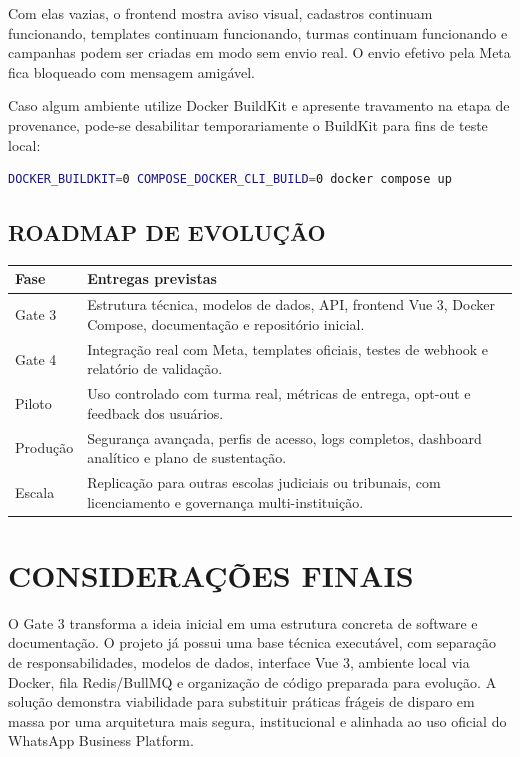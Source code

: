 \documentclass[12pt,letterpaper,oneside]{report}
\begin{document}
Com elas vazias, o frontend mostra aviso visual, cadastros continuam funcionando, templates continuam funcionando, turmas continuam funcionando e campanhas podem ser criadas em modo sem envio real. O envio efetivo pela Meta fica bloqueado com mensagem amigável.

Caso algum ambiente utilize Docker BuildKit e apresente travamento na etapa de provenance, pode-se desabilitar temporariamente o BuildKit para fins de teste local:

\begin{lstlisting}[language=bash]
DOCKER_BUILDKIT=0 COMPOSE_DOCKER_CLI_BUILD=0 docker compose up
\end{lstlisting}

\section{ROADMAP DE EVOLUÇÃO}

\begin{quadro}[H]
\centering
\caption{Roadmap técnico}
\vspace{0.3cm}
\begin{tabular}{|p{3cm}|p{10cm}|}
\hline
\textbf{Fase} & \textbf{Entregas previstas}\\
\hline
Gate 3 & Estrutura técnica, modelos de dados, API, frontend Vue 3, Docker Compose, documentação e repositório inicial.\\
\hline
Gate 4 & Integração real com Meta, templates oficiais, testes de webhook e relatório de validação.\\
\hline
Piloto & Uso controlado com turma real, métricas de entrega, opt-out e feedback dos usuários.\\
\hline
Produção & Segurança avançada, perfis de acesso, logs completos, dashboard analítico e plano de sustentação.\\
\hline
Escala & Replicação para outras escolas judiciais ou tribunais, com licenciamento e governança multi-instituição.\\
\hline
\end{tabular}
\end{quadro}

\chapter{CONSIDERAÇÕES FINAIS}

O Gate 3 transforma a ideia inicial em uma estrutura concreta de software e documentação. O projeto já possui uma base técnica executável, com separação de responsabilidades, modelos de dados, interface Vue 3, ambiente local via Docker, fila Redis/BullMQ e organização de código preparada para evolução. A solução demonstra viabilidade para substituir práticas frágeis de disparo em massa por uma arquitetura mais segura, institucional e alinhada ao uso oficial do WhatsApp Business Platform.
\end{document}
